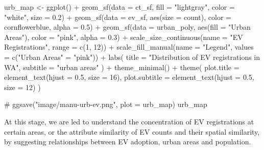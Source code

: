 \documentclass[
  letterpaper,
  DIV=11,
  numbers=noendperiod]{scrartcl}
\newenvironment{Shaded}{\begin{snugshade}}{\end{snugshade}}
\newcommand{\AttributeTok}[1]{\textcolor[rgb]{0.40,0.45,0.13}{#1}}
\newcommand{\CommentTok}[1]{\textcolor[rgb]{0.37,0.37,0.37}{#1}}
\newcommand{\DecValTok}[1]{\textcolor[rgb]{0.68,0.00,0.00}{#1}}
\newcommand{\FloatTok}[1]{\textcolor[rgb]{0.68,0.00,0.00}{#1}}
\newcommand{\FunctionTok}[1]{\textcolor[rgb]{0.28,0.35,0.67}{#1}}
\newcommand{\NormalTok}[1]{\textcolor[rgb]{0.00,0.23,0.31}{#1}}
\newcommand{\OtherTok}[1]{\textcolor[rgb]{0.00,0.23,0.31}{#1}}
\newcommand{\SpecialCharTok}[1]{\textcolor[rgb]{0.37,0.37,0.37}{#1}}
\newcommand{\StringTok}[1]{\textcolor[rgb]{0.13,0.47,0.30}{#1}}
\begin{document}
\begin{Shaded}
\begin{Highlighting}[]
\NormalTok{urb\_map }\OtherTok{\textless{}{-}} \FunctionTok{ggplot}\NormalTok{() }\SpecialCharTok{+}
  \FunctionTok{geom\_sf}\NormalTok{(}\AttributeTok{data =}\NormalTok{ ct\_sf, }\AttributeTok{fill =} \StringTok{"lightgray"}\NormalTok{, }\AttributeTok{color =} \StringTok{"white"}\NormalTok{, }\AttributeTok{size =} \FloatTok{0.2}\NormalTok{) }\SpecialCharTok{+} 
  \FunctionTok{geom\_sf}\NormalTok{(}\AttributeTok{data =}\NormalTok{ ev\_sf, }\FunctionTok{aes}\NormalTok{(}\AttributeTok{size =}\NormalTok{ count), }\AttributeTok{color =} \StringTok{\textquotesingle{}cornflowerblue\textquotesingle{}}\NormalTok{, }\AttributeTok{alpha =} \FloatTok{0.5}\NormalTok{) }\SpecialCharTok{+}
  \FunctionTok{geom\_sf}\NormalTok{(}\AttributeTok{data =}\NormalTok{ urban\_poly, }\FunctionTok{aes}\NormalTok{(}\AttributeTok{fill =} \StringTok{"Urban Areas"}\NormalTok{), }\AttributeTok{color =} \StringTok{"pink"}\NormalTok{, }\AttributeTok{alpha =} \FloatTok{0.3}\NormalTok{) }\SpecialCharTok{+}
  \FunctionTok{scale\_size\_continuous}\NormalTok{(}\AttributeTok{name =} \StringTok{"EV Registrations"}\NormalTok{, }\AttributeTok{range =} \FunctionTok{c}\NormalTok{(}\DecValTok{1}\NormalTok{, }\DecValTok{12}\NormalTok{)) }\SpecialCharTok{+}
  \FunctionTok{scale\_fill\_manual}\NormalTok{(}\AttributeTok{name =} \StringTok{"Legend"}\NormalTok{, }\AttributeTok{values =} \FunctionTok{c}\NormalTok{(}\StringTok{"Urban Areas"} \OtherTok{=} \StringTok{"pink"}\NormalTok{)) }\SpecialCharTok{+}
  \FunctionTok{labs}\NormalTok{(}
    \AttributeTok{title =} \StringTok{"Distribution of EV registrations in WA"}\NormalTok{,}
    \AttributeTok{subtitle =} \StringTok{"urban areas"}
\NormalTok{  ) }\SpecialCharTok{+}
  \FunctionTok{theme\_minimal}\NormalTok{() }\SpecialCharTok{+}
  \FunctionTok{theme}\NormalTok{(}
    \AttributeTok{plot.title =} \FunctionTok{element\_text}\NormalTok{(}\AttributeTok{hjust =} \FloatTok{0.5}\NormalTok{, }\AttributeTok{size =} \DecValTok{16}\NormalTok{),}
    \AttributeTok{plot.subtitle =} \FunctionTok{element\_text}\NormalTok{(}\AttributeTok{hjust =} \FloatTok{0.5}\NormalTok{, }\AttributeTok{size =} \DecValTok{12}\NormalTok{)}
\NormalTok{  )}

\CommentTok{\# ggsave("image/manu{-}urb{-}ev.png", plot = urb\_map)}
\NormalTok{urb\_map}
\end{Highlighting}
\end{Shaded}

At this stage, we are led to understand the concentration of EV
registrations at certain areas, or the attribute similarity of EV counts
and their spatial similarity, by suggesting relationships between EV
adoption, urban areas and population.
\end{document}
